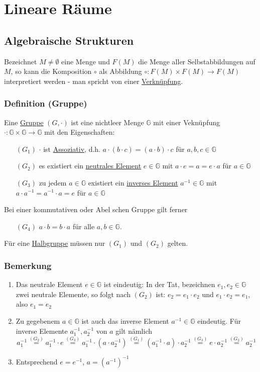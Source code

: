 \section{Lineare Räume}
\subsection{Algebraische Strukturen}
Bezeichnet $M\not=\emptyset$ eine Menge und $F(M)$ die Menge aller Selbstabbildungen auf $M$, so kann die Komposition $\circ$ als Abbildung $\circ : F(M)\times F(M) \rightarrow F(M)$ interpretiert werden - man spricht von einer \underline{Verknüpfung}.
\subsubsection{Definition (Gruppe)}
Eine \underline{Gruppe} $(G,\cdot)$ ist eine nichtleer Menge $\mathbb{G}$ mit einer Veknüpfung $\cdot:\mathbb{G}\times\mathbb{G} \rightarrow \mathbb{G}$ mit den Eigenschaften:
\begin{enumerate}
\item[$(G_1)$] $\cdot$ ist \underline{Assoziativ}, d.h. $a\cdot(b\cdot c)=(a\cdot b)\cdot c$ für $a,b,c\in \mathbb{G}$\\
\item[$(G_2)$] es existiert ein \underline{neutrales Element} $e\in\mathbb{G}$ mit $a\cdot e=a=e\cdot a$ für $a\in\mathbb{G}$\\
\item[$(G_3)$] zu jedem $a\in\mathbb{G}$ existiert ein \underline{inverses Element} $a^{-1}\in \mathbb{G}$ mit $a\cdot a^{-1}=a^{-1}\cdot a=e$ für $a\in \mathbb{G}$ \end{enumerate}
Bei einer kommutativen oder Abel schen Gruppe gilt ferner
\begin{enumerate}\item[$(G_4)$] $a\cdot b=b\cdot a$ für alle $a,b\in \mathbb{G}$.\end{enumerate}
Für eine \underline{Halbgruppe} müssen nur $(G_1)$ und $(G_2)$ gelten.
\subsubsection{Bemerkung}
\renewcommand{\labelenumi}{(\arabic{enumi})}
\begin{enumerate}
\item Das neutrale Element $e\in\mathbb{G}$ ist eindeutig: In der Tat, bezeichnen $e_1,e_2\in\mathbb{G}$ zwei neutrale Elemente, so folgt nach $(G_2)$ ist: $e_2=e_1\cdot e_2$ und $e_1\cdot e_2=e_1$, also $e_1=e_2$
\item Zu gegebenem $a\in\mathbb{G}$ ist auch das inverse Element $a^{-1}\in\mathbb{G}$ eindeutig.  Für inverse Elemente $a_1^{-1},a_2^{-1}$ von $a$ gilt nämlich
\[a_1^{-1}\stackrel{(G_2)}{=}a_1^{-1}\cdot e\stackrel{(G_3)}{=}a_1^{-1}\cdot(a\cdot a_2^{-1})\stackrel{(G_1)}{=}(a_1^{-1}\cdot a)\cdot a_2^{-1}\stackrel{(G_3)}{=}e\cdot a_2^{-1}\stackrel{(G_2)}{=}a_2^{-1}\]
\item Entsprechend $e=e^{-1}$, $a=(a^{-1})^{-1}$
\end{enumerate}
